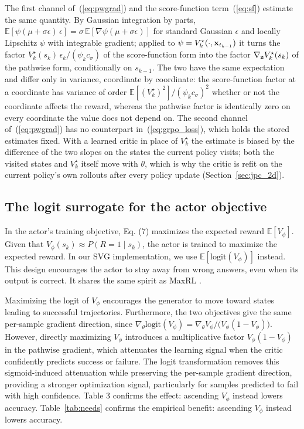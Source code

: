 The first channel of~(\ref{eq:pwgrad}) and the score-function term~(\ref{eq:sf}) estimate the same quantity. By Gaussian integration by parts, $\mathbb E[\psi(\mu+\sigma\epsilon)\,\epsilon]=\sigma\,\mathbb E[\nabla\psi(\mu+\sigma\epsilon)]$ for standard Gaussian $\epsilon$ and locally Lipschitz $\psi$ with integrable gradient; applied to $\psi=V^\star_k(\cdot,{\mathbf{x}}_{t_{k-1}})$ it turns the factor $V^\star_k(s_k)\,\epsilon_k/(\psi_kc_\sigma)$ of the score-function form into the factor $\nabla_{{\mathbf{z}}}V^\star_k(s_k)$ of the pathwise form, conditionally on $s_{k-1}$. The two have the same expectation and differ only in variance, coordinate by coordinate: the score-function factor at a coordinate has variance of order $\mathbb E[(V^\star_k)^2]/(\psi_kc_\sigma)^2$ whether or not the coordinate affects the reward, whereas the pathwise factor is identically zero on every coordinate the value does not depend on. The second channel of~(\ref{eq:pwgrad}) has no counterpart in~(\ref{eq:grpo_loss}), which holds the stored estimates fixed. With a learned critic in place of $V^\star_k$ the estimate is biased by the difference of the two slopes on the states the current policy visits; both the visited states and $V^\star_k$ itself move with $\theta$, which is why the critic is refit on the current policy's own rollouts after every policy update (Section~\ref{sec:jpc_2d}).

\begingroup
\color{blue}
\subsection{The logit surrogate for the actor objective}
\label{app:logit_surrogate}
In the actor's training objective, Eq. (7) maximizes the expected reward $\mathbb{E}[V_\phi]$. Given that $V_\phi(s_k)\approx P(R=1\mid s_k)$, the actor is trained to maximize the expected reward. In our SVG implementation, we use $\mathbb{E}[\mathrm{logit}(V_{\phi})]$ instead. This design encourages the actor to stay away from wrong answers, even when its output is correct. It shares the same spirit as MaxRL \citep{tajwar2026maximum}.

Maximizing the logit of $V_\phi$ encourages the generator to move toward states leading to successful trajectories. Furthermore, the two objectives give the same per-sample gradient direction, since $\nabla_\theta\mathrm{logit}(V_\phi)=\nabla_\theta V_\phi/\big(V_\phi(1-V_\phi)\big)$. However, directly maximizing $V_\phi$ introduces a multiplicative factor $V_\phi(1-V_\phi)$ in the pathwise gradient, which attenuates the learning signal when the critic confidently predicts success or failure. The logit transformation removes this sigmoid-induced attenuation while preserving the per-sample gradient direction, providing a stronger optimization signal, particularly for samples predicted to fail with high confidence. Table 3 confirms the effect: ascending $V_\phi$ instead lowers accuracy. Table~\ref{tab:needs} confirms the empirical benefit: ascending $V_\phi$ instead lowers accuracy.
\endgroup

